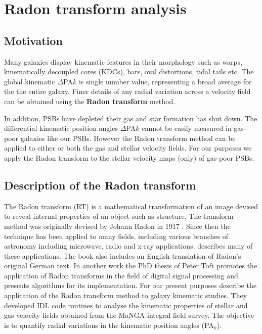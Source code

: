 \section{Radon transform analysis}
\label{sec:methods-II-Radon}

\subsection{Motivation}
\label{sec:motivation}

Many galaxies display kinematic features in their morphology such as warps, kinematically decoupled cores (KDCs), bars, oval distortions, tidal tails etc. The global kinematic $\Delta$PA${k}$ is single number value, representing a broad average for the the entire galaxy. Finer details of any radial variation across a velocity field can be obtained using the \textbf{Radon transform} method.

In addition, PSBs have depleted their gas and star formation has shut down. The differential kinematic position angles $\Delta$PA${k}$ cannot be easily measured in gas-poor galaxies like our PSBs. However the Radon transform method can be applied to either or both the gas and stellar velocity fields. For our purposes we apply the Radon transform to the stellar velocity maps (only) of gas-poor PSBs. 


\subsection{Description of the Radon transform}

The Radon transform (RT) is a mathematical transformation of an image devised to reveal internal properties of an object such as structure. The transform method was originally devised by Johann Radon in 1917 \citep{radon1917determination}. Since then the technique has been applied to many fields, including various branches of astronomy including microwave, radio and x-ray applications. \citet{deans2007radon} describes many of these applications. The book also includes an English translation of Radon's original German text. In another work the PhD thesis of  Peter Toft \citet{7910dc8d5b654c90ac4bc94c67d06f01} promotes the application of Radon transforms in the field of digital signal processing and presents algorithms for its implementation. For our present purposes \cite{2018MNRAS.480.2217S} describe the application of the Radon transform method to galaxy kinematic studies. They developed IDL code routines to analyse the kinematic properties of stellar and gas velocity fields obtained from the MaNGA integral field survey. The objective is to quantify radial variations in the kinematic position angles (PA$_{k}$).

